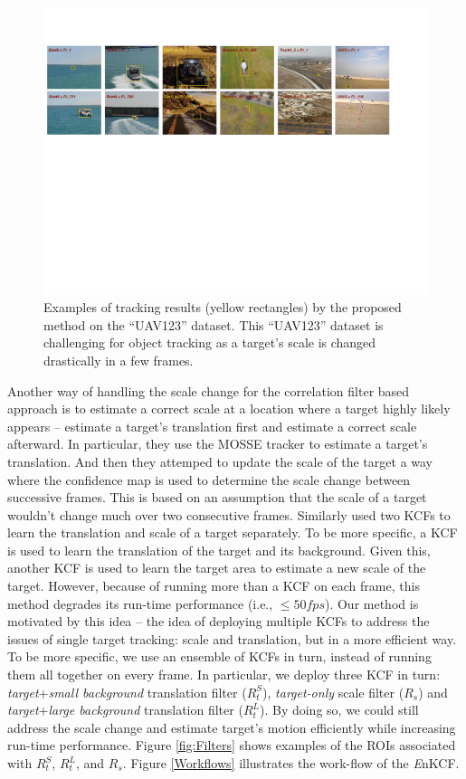 \documentclass{bmvc2k}
\begin{document}
\begin{figure}[!t]
\includegraphics[width=\textwidth]{figures/ResultsIntroduction.pdf}
\caption{Examples of tracking results (yellow rectangles) by the
  proposed method on the ``UAV123'' dataset. This ``UAV123'' dataset
  is challenging for object tracking as a target's scale is changed
  drastically in a few frames.}
\label{ResultsIntroduction}
\end{figure}

Another way of handling the scale change for the correlation filter
based approach is to estimate a correct scale at a location where a
target highly likely appears \cite{zhang2014fast} -- estimate a
target's translation first and estimate a correct scale afterward. In
particular, they use the MOSSE tracker to estimate a target's
translation. And then they attemped to update the scale of the target
a way where the confidence map is used to determine the scale change
between successive frames. This is based on an assumption that the
scale of a target wouldn't change much over two consecutive
frames. Similarly \cite{ma2015long} used two KCFs to learn the
translation and scale of a target separately. To be more specific, a
KCF is used to learn the translation of the target and its
background. Given this, another KCF is used to learn the target area
to estimate a new scale of the target. However, because of running
more than a KCF on each frame, this method degrades its run-time
performance (i.e., $\leq 50 fps$). Our method is motivated by this
idea -- the idea of deploying multiple KCFs to address the issues of
single target tracking: scale and translation, but in a more efficient
way. To be more specific, we use an ensemble of KCFs in turn, instead
of running them all together on every frame. In particular, we deploy
three KCF in turn: \textit{target}+\textit{small background}
translation filter ($R_{t}^{S}$), \textit{target-only} scale filter
($R_{s}$) and \textit{target}+\textit{large background} translation
filter ($R_{t}^{L}$). By doing so, we could still address the scale
change and estimate target's motion efficiently while increasing
run-time performance. Figure \ref{fig:Filters} shows examples of the
ROIs associated with $R_{t}^{S}$, $R_{t}^{L}$, and $R_{s}$. Figure
\ref{Workflows} illustrates the work-flow of the {\it E}nKCF.
\end{document}
